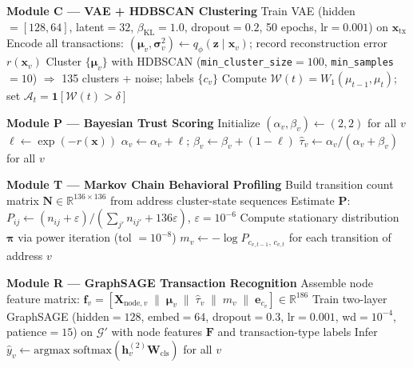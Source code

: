 \begin{algorithm}[t]
\begin{algorithmic}[1]
\Statex
\Statex \textbf{Module C — VAE + HDBSCAN Clustering}
\State Train VAE (hidden$=[128,64]$, latent$=32$, $\beta_{\mathrm{KL}}=1.0$,
       dropout$=0.2$, 50 epochs, lr$=0.001$) on $\mathbf{x}_{\mathrm{tx}}$
\State Encode all transactions:
       $(\boldsymbol{\mu}_v, \boldsymbol{\sigma}^2_v)
        \leftarrow q_\phi(\mathbf{z} \mid \mathbf{x}_v)$;
       record reconstruction error $r(\mathbf{x}_v)$
\State Cluster $\{\boldsymbol{\mu}_v\}$ with HDBSCAN
       (\texttt{min\_cluster\_size}$=100$, \texttt{min\_samples}$=10$)
       $\Rightarrow$ 135 clusters + noise; labels $\{c_v\}$
    \State Compute $\mathcal{W}(t) = W_1(\mu_{t-1}, \mu_t)$;
           set $\mathcal{A}_t = \mathbf{1}[\mathcal{W}(t) > \delta]$
\EndFor

\Statex
\Statex \textbf{Module P — Bayesian Trust Scoring}
\State Initialize $(\alpha_v, \beta_v) \leftarrow (2, 2)$ for all $v$
    \State $\ell \leftarrow \exp(-r(\mathbf{x}))$
    \State $\alpha_v \leftarrow \alpha_v + \ell$;\quad
           $\beta_v \leftarrow \beta_v + (1-\ell)$
\EndFor
\State $\hat{\tau}_v \leftarrow \alpha_v / (\alpha_v + \beta_v)$
       for all $v$

\Statex
\Statex \textbf{Module T — Markov Chain Behavioral Profiling}
\State Build transition count matrix $\mathbf{N} \in \mathbb{R}^{136 \times 136}$
       from address cluster-state sequences
\State Estimate $\mathbf{P}$:
       $P_{ij} \leftarrow (n_{ij} + \varepsilon) /
                           (\sum_{j'} n_{ij'} + 136\varepsilon)$,\;
       $\varepsilon = 10^{-6}$
\State Compute stationary distribution $\boldsymbol{\pi}$ via power iteration
       (tol $=10^{-8}$)
\State $m_v \leftarrow -\log P_{c_{v,t-1},\, c_{v,t}}$
       for each transition of address $v$

\Statex
\Statex \textbf{Module R — GraphSAGE Transaction Recognition}
\State Assemble node feature matrix:
       $\mathbf{f}_v =
        [\mathbf{X}_{\mathrm{node},v} \;\|\;
         \boldsymbol{\mu}_v \;\|\;
         \hat{\tau}_v \;\|\;
         m_v \;\|\;
         \mathbf{e}_{c_v}]
        \in \mathbb{R}^{186}$
\State Train two-layer GraphSAGE (hidden$=128$, embed$=64$, dropout$=0.3$,
       lr$=0.001$, wd$=10^{-4}$, patience$=15$) on $\mathcal{G}'$
       with node features $\mathbf{F}$ and transaction-type labels
\State Infer $\hat{y}_v \leftarrow \mathrm{argmax}\;\mathrm{softmax}
       (\mathbf{h}_v^{(2)}\mathbf{W}_{\mathrm{cls}})$ for all $v$


\end{algorithmic}
\end{algorithm}
